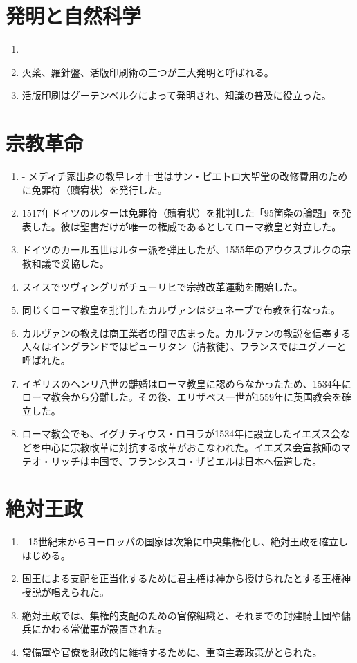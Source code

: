 \documentclass[twocolumn,autodetect-engine,dvipdfmx-if-dvi,ja=standard]{jsarticle} \usepackage{mystyle}
\begin{document}
\section{発明と自然科学}


\begin{enumerate}
\item
\item 火薬、羅針盤、活版印刷術の三つが三大発明と呼ばれる。
\item 活版印刷はグーテンベルクによって発明され、知識の普及に役立った。
\end{enumerate}


\section{宗教革命}


\begin{enumerate}
\item - メディチ家出身の教皇レオ十世はサン・ピエトロ大聖堂の改修費用のために免罪符（贖宥状）を発行した。
\item 1517年ドイツのルターは免罪符（贖宥状）を批判した「95箇条の論題」を発表した。彼は聖書だけが唯一の権威であるとしてローマ教皇と対立した。
\item ドイツのカール五世はルター派を弾圧したが、1555年のアウクスブルクの宗教和議で妥協した。
\item スイスでツヴィングリがチューリヒで宗教改革運動を開始した。
\item 同じくローマ教皇を批判したカルヴァンはジュネーブで布教を行なった。
\item カルヴァンの教えは商工業者の間で広まった。カルヴァンの教説を信奉する人々はイングランドではピューリタン（清教徒）、フランスではユグノーと呼ばれた。
\item イギリスのヘンリ八世の離婚はローマ教皇に認めらなかったため、1534年にローマ教会から分離した。その後、エリザベス一世が1559年に英国教会を確立した。
\item ローマ教会でも、イグナティウス・ロヨラが1534年に設立したイエズス会などを中心に宗教改革に対抗する改革がおこなわれた。イエズス会宣教師のマテオ・リッチは中国で、フランシスコ・ザビエルは日本へ伝道した。

\end{enumerate}


\section{絶対王政}


\begin{enumerate}
\item   - 15世紀末からヨーロッパの国家は次第に中央集権化し、絶対王政を確立しはじめる。
\item 国王による支配を正当化するために君主権は神から授けられたとする王権神授説が唱えられた。
\item 絶対王政では、集権的支配のための官僚組織と、それまでの封建騎士団や傭兵にかわる常備軍が設置された。
\item 常備軍や官僚を財政的に維持するために、重商主義政策がとられた。
\end{enumerate}
\end{document}
